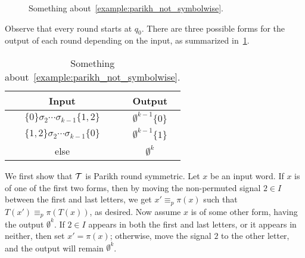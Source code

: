 \begin{example}
\begin{figure}[ht]
	\caption{Something about~\cref{example:parikh_not_symbolwise}.}
	\label{fig:example_parikh_not_symbolwise}
\end{figure}

Observe that every round starts at $q_0$. There are three possible forms for the output of each round depending on the input, as summarized in~\cref{tab:example_parikh_not_symbolwise}.

\begin{table}[!htb]
    \centering
    \caption{Something about~\cref{example:parikh_not_symbolwise}.}
    \vspace{2mm}
    \def\arraystretch{1.3}
    \begin{tabular}{c|c}
        Input & Output \\
        \hline \hline
        $\{0\}\sigma_2\cdots \sigma_{k-1}\{1,2\}$ & $\emptyset^{k-1} \{0\}$ \\
        \hline
        $\{1,2\}\sigma_2\cdots \sigma_{k-1}\{0\}$ & $\emptyset^{k-1} \{1\}$ \\
        \hline
        else & $\emptyset^k$ \\
    \end{tabular}
    \label{tab:example_parikh_not_symbolwise}
\end{table}

We first show that $\mathcal{T}$ is Parikh round symmetric. Let $x$ be an input word. If $x$ is of one of the first two forms, then by moving the non-permuted signal $2\in I$ between the first and last letters, we get $x'\equiv_p \pi(x)$ such that $T(x')\equiv_p\pi(T(x))$, as desired. Now assume $x$ is of some other form, having the output $\emptyset^k$. If $2\in I$ appears in both the first and last letters, or it appears in neither, then set $x'=\pi(x)$; otherwise, move the signal $2$ to the other letter, and the output will remain $\emptyset^k$.


\end{example}
